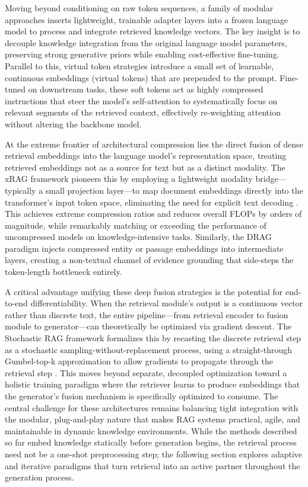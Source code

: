 \documentclass[11pt,a4paper]{article}
\begin{document}
Moving beyond conditioning on raw token sequences, a family of modular approaches inserts lightweight, trainable adapter layers into a frozen language model to process and integrate retrieved knowledge vectors. The key insight is to decouple knowledge integration from the original language model parameters, preserving strong generative priors while enabling cost-effective fine-tuning. Parallel to this, virtual token strategies introduce a small set of learnable, continuous embeddings (virtual tokens) that are prepended to the prompt. Fine-tuned on downstream tasks, these soft tokens act as highly compressed instructions that steer the model's self-attention to systematically focus on relevant segments of the retrieved context, effectively re-weighting attention without altering the backbone model.

At the extreme frontier of architectural compression lies the direct fusion of dense retrieval embeddings into the language model's representation space, treating retrieved embeddings not as a source for text but as a distinct modality. The xRAG framework pioneers this by employing a lightweight modality bridge---typically a small projection layer---to map document embeddings directly into the transformer's input token space, eliminating the need for explicit text decoding \cite{arxiv:2405.13792v1}. This achieves extreme compression ratios and reduces overall FLOPs by orders of magnitude, while remarkably matching or exceeding the performance of uncompressed models on knowledge-intensive tasks. Similarly, the DRAG paradigm injects compressed entity or passage embeddings into intermediate layers, creating a non-textual channel of evidence grounding that side-steps the token-length bottleneck entirely.

A critical advantage unifying these deep fusion strategies is the potential for end-to-end differentiability. When the retrieval module's output is a continuous vector rather than discrete text, the entire pipeline---from retrieval encoder to fusion module to generator---can theoretically be optimized via gradient descent. The Stochastic RAG framework formalizes this by recasting the discrete retrieval step as a stochastic sampling-without-replacement process, using a straight-through Gumbel-top-k approximation to allow gradients to propagate through the retrieval step \cite{arxiv:2405.02816v1}. This moves beyond separate, decoupled optimization toward a holistic training paradigm where the retriever learns to produce embeddings that the generator's fusion mechanism is specifically optimized to consume. The central challenge for these architectures remains balancing tight integration with the modular, plug-and-play nature that makes RAG systems practical, agile, and maintainable in dynamic knowledge environments. While the methods described so far embed knowledge statically before generation begins, the retrieval process need not be a one-shot preprocessing step; the following section explores adaptive and iterative paradigms that turn retrieval into an active partner throughout the generation process.
\end{document}
